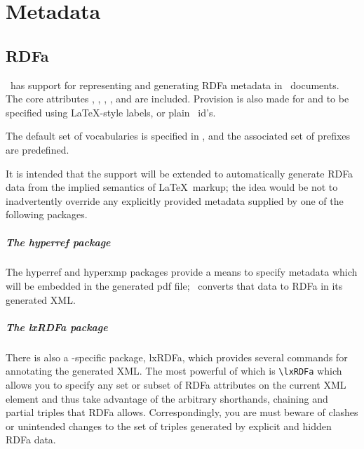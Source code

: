 \documentclass{book}
\begin{document}

\chapter{Metadata}\label{metadata}
\section{RDFa}\label{metadata.RDFa}
\LaTeXML\ has support for representing and generating RDFa metadata in \LaTeXML\ documents.
The core attributes , , , 
,  and  are included.
Provision is also made for  and  to be specified
using \LaTeX-style labels, or plain \XML\ id's.


The default set of vocabularies is specified in
,
and the associated set of prefixes are predefined.

It is intended that the support will be extended to automatically
generate RDFa data from the implied semantics of \LaTeX\ markup;
the idea would be not to inadvertently override any explicitly
provided metadata supplied by one of the following packages.

\paragraph{The hyperref package}
The  hyperref and hyperxmp packages provide a means to specify metadata
which will be embedded in the generated pdf file; \LaTeXML\ converts that
data to RDFa in its generated XML.

\paragraph{The lxRDFa package}
There is also a \LaTeXML-specific package, lxRDFa, which provides
several commands for annotating the generated XML.
The most powerful of which is \verb|\lxRDFa| which allows you to specify
any set or subset of RDFa attributes on the current XML element and thus
take advantage of the arbitrary shorthands, chaining and partial triples
that RDFa allows.  Correspondingly, you are must beware of
clashes or unintended changes to the set of triples generated
by explicit and hidden RDFa data.
\end{document}
